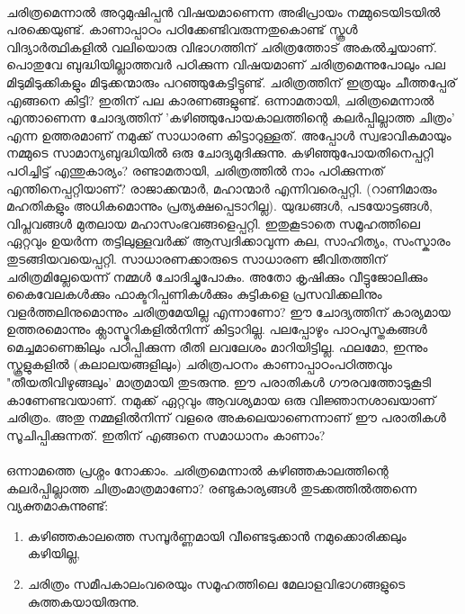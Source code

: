 \paragraph{}	ചരിത്രമെന്നാൽ അറുമുഷിപ്പൻ വിഷയമാണെന്ന അഭിപ്രായം നമ്മുടെയിടയിൽ പരക്കെയുണ്ട്. കാണാപ്പാഠം പഠിക്കേണ്ടിവരുന്നതുകൊണ്ട് സ്കൂൾ വിദ്യാർത്ഥികളിൽ വലിയൊരു വിഭാഗത്തിന് ചരിത്രത്തോട് അകൽച്ചയാണ്. പൊതുവേ ബുദ്ധിയില്ലാത്തവർ പഠിക്കുന്ന വിഷയമാണ് ചരിത്രമെന്നുപോലും പല മിടുമിടുക്കികളും മിടുക്കന്മാരും പറഞ്ഞുകേട്ടിട്ടുണ്ട്. ചരിത്രത്തിന് ഇത്രയും ചീത്തപ്പേര് എങ്ങനെ കിട്ടി?
ഇതിന് പല കാരണങ്ങളുണ്ട്. ഒന്നാമതായി, ചരിത്രമെന്നാൽ എന്താണെന്ന ചോദ്യത്തിന് 'കഴിഞ്ഞുപോയകാലത്തിന്റെ കലർപ്പില്ലാത്ത ചിത്രം' എന്ന ഉത്തരമാണ് നമുക്ക് സാധാരണ കിട്ടാറുള്ളത്. അപ്പോൾ സ്വഭാവികമായും നമ്മുടെ സാമാന്യബുദ്ധിയിൽ ഒരു ചോദ്യമുദിക്കുന്നു. കഴിഞ്ഞുപോയതിനെപ്പറ്റി പഠിച്ചിട്ട് എന്തുകാര്യം? രണ്ടാമതായി, ചരിത്രത്തിൽ നാം പഠിക്കുന്നത് എന്തിനെപ്പറ്റിയാണ്? രാജാക്കന്മാർ, മഹാന്മാർ എന്നിവരെപ്പറ്റി. (റാണിമാരും മഹതികളും അധികമൊന്നും പ്രത്യക്ഷപ്പെടാറില്ല). യുദ്ധങ്ങൾ, പടയോട്ടങ്ങൾ, വിപ്ലവങ്ങൾ മുതലായ മഹാസംഭവങ്ങളെപ്പറ്റി. ഇതുകൂടാതെ സമൂഹത്തിലെ ഏറ്റവും ഉയർന്ന തട്ടിലുള്ളവർക്ക് ആസ്വദിക്കാവുന്ന കല, സാഹിത്യം, സംസ്കാരം തുടങ്ങിയവയെപ്പറ്റി. സാധാരണക്കാരുടെ സാധാരണ ജീവിതത്തിന് ചരിത്രമില്ലേയെന്ന് നമ്മൾ ചോദിച്ചുപോകും. അതോ കൃഷിക്കും വീട്ടുജോലിക്കും കൈവേലകൾക്കും ഫാക്ടറിപ്പണികൾക്കും കുട്ടികളെ പ്രസവിക്കലിനും വളർത്തലിനുമൊന്നും ചരിത്രമേയില്ല എന്നാണോ? ഈ ചോദ്യത്തിന് കാര്യമായ ഉത്തരമൊന്നും ക്ലാസ്മുറികളിൽനിന്ന് കിട്ടാറില്ല. പലപ്പോഴും പാഠപുസ്തകങ്ങൾ മെച്ചമാണെങ്കിലും പഠിപ്പിക്കുന്ന രീതി ലവലേശം മാറിയിട്ടില്ല. ഫലമോ, ഇന്നും സ്കൂളുകളിൽ (കലാലയങ്ങളിലും) ചരിത്രപഠനം കാണാപ്പാഠംപഠിത്തവും "തീയതിവിഴുങ്ങലും' മാത്രമായി തുടരുന്നു. ഈ പരാതികൾ ഗൗരവത്തോടുകൂടി കാണേണ്ടവയാണ്. നമുക്ക് ഏറ്റവും ആവശ്യമായ ഒരു വിജ്ഞാനശാഖയാണ് ചരിത്രം. അതു നമ്മളിൽനിന്ന് വളരെ അകലെയാണെന്നാണ് ഈ പരാതികൾ സൂചിപ്പിക്കുന്നത്. ഇതിന് 
എങ്ങനെ സമാധാനം കാണാം?

\paragraph{}		ഒന്നാമത്തെ പ്രശ്നം നോക്കാം. ചരിത്രമെന്നാൽ കഴിഞ്ഞകാലത്തിന്റെ കലർപ്പില്ലാത്ത ചിത്രംമാത്രമാണോ? രണ്ടുകാര്യങ്ങൾ തുടക്കത്തിൽത്തന്നെ വ്യക്തമാകുന്നുണ്ട്:
\begin{enumerate}
\item
 കഴിഞ്ഞകാലത്തെ സമ്പൂർണ്ണമായി വീണ്ടെടുക്കാൻ നമുക്കൊരിക്കലും കഴിയില്ല,
\item ചരിത്രം സമീപകാലംവരെയും സമൂഹത്തിലെ മേലാളവിഭാഗങ്ങളുടെ കുത്തകയായിരുന്നു.
\end{enumerate}

